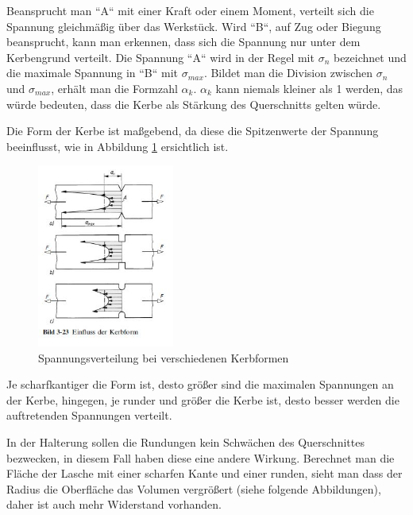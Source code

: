 			\newpage

	Beansprucht man “A“ mit einer Kraft oder einem Moment, verteilt sich die Spannung gleichmäßig über das Werkstück.
	Wird “B“, auf Zug oder Biegung beansprucht, kann man erkennen, dass sich die Spannung nur unter dem Kerbengrund verteilt.
	Die Spannung “A“ wird in der Regel mit $\sigma_{n}$ bezeichnet und die maximale Spannung in “B“ mit $\sigma_{max}$.
	Bildet man die Division zwischen $\sigma_{n}$ und $\sigma_{max}$, erhält man die Formzahl $\alpha_{k}$.
	$\alpha_{k}$ kann niemals kleiner als 1 werden, das würde bedeuten, dass die Kerbe als Stärkung des Querschnitts gelten würde.

	Die Form der Kerbe ist maßgebend, da diese die Spitzenwerte der Spannung beeinflusst, wie in Abbildung \ref{kerbform} ersichtlich ist.

			\begin{figure}[H]
			\begin{centering}
			\includegraphics[width = 0.4\textwidth]{Bilder/kerbform}
			\par\end{centering}
			\caption[Spannungsverteilung bei verschiedenen Kerbformen]{Spannungsverteilung bei verschiedenen Kerbformen\cite{kerbformen}}
			\label{kerbform}
			\end{figure}

	Je scharfkantiger die Form ist, desto größer sind die maximalen Spannungen an der Kerbe, hingegen, je runder und größer die Kerbe ist, desto besser werden die auftretenden Spannungen verteilt.

	In der Halterung sollen die Rundungen kein Schwächen des Querschnittes bezwecken, in diesem Fall haben diese eine andere Wirkung.
	Berechnet man die Fläche der Lasche mit einer scharfen Kante und einer runden,
	sieht man dass der Radius die Oberfläche \bzw das Volumen vergrößert (siehe folgende Abbildungen), daher ist auch mehr Widerstand vorhanden.

